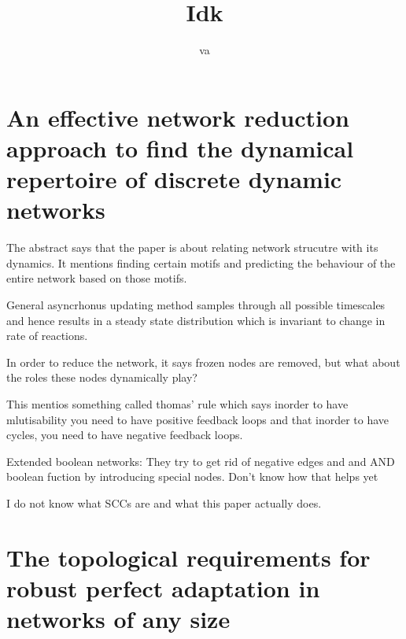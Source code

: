 \documentclass{article}
\title{Idk }
\author{va}
\begin{document}
\maketitle

\section{An effective network reduction approach to find the dynamical repertoire of discrete
dynamic networks}

The abstract says that the paper is about relating network strucutre with its dynamics. 
It mentions finding certain motifs and predicting the behaviour of the entire network based on those motifs. 

General asyncrhonus updating method samples through all possible timescales and hence results in a steady state distribution which is invariant to change in rate of reactions. 


In order to reduce the network, it says frozen nodes are removed, but what about the roles these nodes dynamically play?

This mentios something called thomas' rule which says inorder to have mlutisability you need to have positive feedback loops and that inorder to have cycles, you need to have negative feedback loops.

Extended boolean networks: They try to get rid of negative edges and and AND boolean fuction by introducing special nodes. Don't know how that helps yet 

I do not know what SCCs are and what this paper actually does. 


\section{The topological requirements for robust perfect
adaptation in networks of any size}
\end{document}
